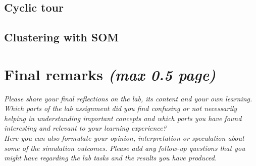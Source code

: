 \documentclass[a4paper]{article}
\begin{document}
\subsection{Cyclic tour}

\subsection{Clustering with SOM}

\section{Final remarks \normalsize{\textit{(max 0.5 page)}}}
\textit{Please share your final reflections on the lab, its content and your own learning. Which parts of the lab assignment did you find confusing or not necessarily helping in understanding important concepts and which parts you have found interesting and relevant to your learning experience? \\
Here you can also formulate your opinion, interpretation or speculation about some of the simulation outcomes. Please add any follow-up questions that you might have regarding the lab tasks and the results you have produced.}
\end{document}
